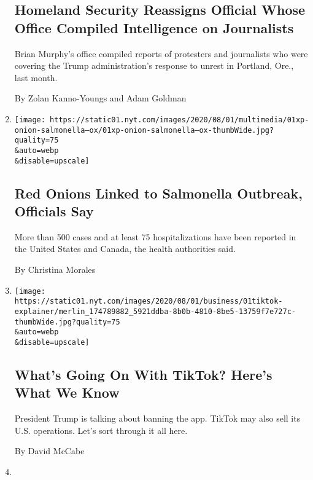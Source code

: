 \begin{enumerate}
{  \subsection{Homeland Security Reassigns Official Whose Office Compiled
  Intelligence on
  Journalists}\label{homeland-security-reassigns-official-whose-office-compiled-intelligence-on-journalists}}

  Brian Murphy's office compiled reports of protesters and journalists
  who were covering the Trump administration's response to unrest in
  Portland, Ore., last month.

  By Zolan Kanno-Youngs and Adam Goldman
\item
  \href{/2020/08/01/us/salmonella-outbreak-onions.html}{}

  \texttt{[image: https://static01.nyt.com/images/2020/08/01/multimedia/01xp-onion-salmonella--ox/01xp-onion-salmonella--ox-thumbWide.jpg?quality=75\\\&auto=webp\\\&disable=upscale]}

  \hypertarget{red-onions-linked-to-salmonella-outbreak-officials-say}{%
  \subsection{Red Onions Linked to Salmonella Outbreak, Officials
  Say}\label{red-onions-linked-to-salmonella-outbreak-officials-say}}

  More than 500 cases and at least 75 hospitalizations have been
  reported in the United States and Canada, the health authorities said.

  By Christina Morales
\item
  \href{/2020/08/01/technology/tiktok-trump-microsoft-bytedance-china-ban.html}{}

  \texttt{[image: https://static01.nyt.com/images/2020/08/01/business/01tiktok-explainer/merlin\_174789882\_5921ddba-8b0b-4810-8be5-13759f7e727c-thumbWide.jpg?quality=75\\\&auto=webp\\\&disable=upscale]}

  \hypertarget{whats-going-on-with-tiktok-heres-what-we-know}{%
  \subsection{What's Going On With TikTok? Here's What We
  Know}\label{whats-going-on-with-tiktok-heres-what-we-know}}

  President Trump is talking about banning the app. TikTok may also sell
  its U.S. operations. Let's sort through it all here.

  By David McCabe
\item
  \href{/2020/08/01/us/politics/biden-lobbyist-ties.html}{}


\end{enumerate}
